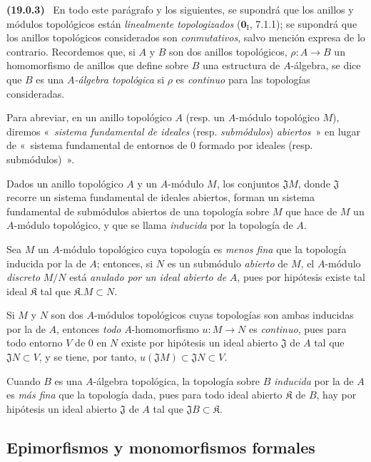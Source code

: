 \documentclass[10pt,oneside]{book}
\makeatletter
\newcommand{\setmanualcurrentlabel}[1]{\def\@currentlabel{#1}}
\newcommand{\oldpage}[2][]{%
  \setcounter{footnote}{0}%
  \marginpar{\scriptsize\textbf{#1}~|~#2}\ignorespaces}
\newenvironment{env}[1][]{\setmanualcurrentlabel{#1}\par\medskip\noindent\textbf{(#1)}\ }{\par}
\makeatother
\begin{document}
\begin{env}[19.0.3]
\label{0.19.0.3-es}
En todo este parágrafo y los siguientes, se supondrá que los anillos y módulos topológicos
están \emph{linealmente topologizados} ($\mathbf{0}_{\mathrm I}$,
7.1.1); se supondrá que los anillos topológicos considerados son \emph{conmutativos},
salvo mención expresa de lo contrario. Recordemos que, si $A$ y $B$ son dos
anillos topológicos, $\rho:A\to B$ un homomorfismo de anillos que define sobre
$B$ una estructura de $A$-álgebra, se dice que $B$ es una \emph{$A$-álgebra
topológica} si $\rho$ es \emph{continuo} para las topologías consideradas.

Para abreviar, en un anillo topológico $A$ (resp. un $A$-módulo topológico
$M$), diremos «~\emph{sistema fundamental de ideales} (resp.
\emph{submódulos}) \emph{abiertos}~» en lugar de «~sistema fundamental de
entornos de 0 formado por ideales (resp. submódulos)~».

Dados un anillo topológico $A$ y un $A$-módulo $M$, los conjuntos
$\mathfrak J M$, donde $\mathfrak J$ recorre un sistema fundamental de ideales
abiertos, forman un sistema fundamental de submódulos abiertos de una topología
sobre $M$ que hace de $M$ un $A$-módulo topológico, y que se llama \emph{inducida}
por la topología de $A$.

Sea $M$ un $A$-módulo topológico cuya topología es \emph{menos fina} que
la topología inducida por la de $A$; entonces, si $N$ es un submódulo
\emph{abierto} de $M$, el $A$-módulo \emph{discreto} $M/N$ está \emph{anulado por
un ideal abierto de} $A$, pues por hipótesis existe tal ideal $\mathfrak K$
tal que $\mathfrak K.M\subset N$.

\oldpage[0\textsubscript{IV-1}]{71}

Si $M$ y $N$ son dos $A$-módulos topológicos cuyas topologías son ambas
inducidas por la de $A$, entonces \emph{todo} $A$-homomorfismo $u:M\to N$
es \emph{continuo}, pues para todo entorno $V$ de 0 en $N$ existe por
hipótesis un ideal abierto $\mathfrak J$ de $A$ tal que $\mathfrak JN\subset V$,
y se tiene, por tanto, $u(\mathfrak JM)\subset\mathfrak JN\subset V$.

Cuando $B$ es una $A$-álgebra topológica, la topología sobre $B$ \emph{inducida}
por la de $A$ es \emph{más fina} que la topología dada, pues para todo
ideal abierto $\mathfrak K$ de $B$, hay por hipótesis un ideal abierto
$\mathfrak J$ de $A$ tal que $\mathfrak JB\subset\mathfrak K$.
\end{env}

\subsection{Epimorfismos y monomorfismos formales}
\label{subsection:0.19.1-es}
\end{document}
